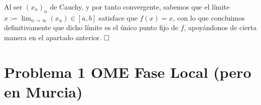 \documentclass{article}
\begin{document}
\newpage

Al ser $(x_n)_n$ de Cauchy, y por tanto convergente, sabemos que el límite $x := \lim_{n \to \infty} (x_n) \in [a, b]$ satisface que $f(x) = x$, con lo que concluimos definitivamente que dicho límite es el único punto fijo de $f$, apoyándonos de cierta manera en el apartado anterior. $\hfill\square$







\newpage

\section{Problema 1 OME Fase Local (pero en Murcia)}
\end{document}
